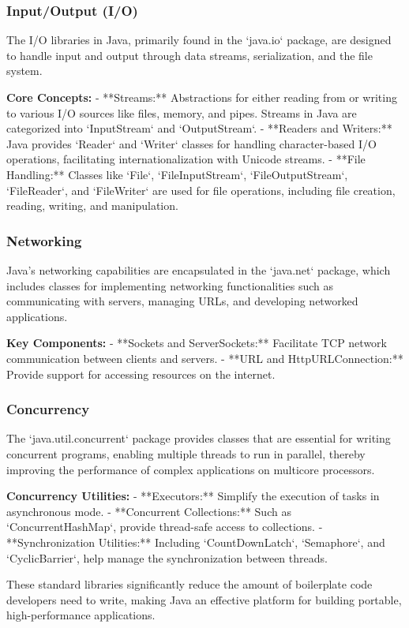 \documentclass{article}
\begin{document}
\subsubsection{Input/Output (I/O)}
The I/O libraries in Java, primarily found in the `java.io` package, are designed to handle input and output through data streams, serialization, and the file system.

\textbf{Core Concepts:}
- **Streams:** Abstractions for either reading from or writing to various I/O sources like files, memory, and pipes. Streams in Java are categorized into `InputStream` and `OutputStream`.
- **Readers and Writers:** Java provides `Reader` and `Writer` classes for handling character-based I/O operations, facilitating internationalization with Unicode streams.
- **File Handling:** Classes like `File`, `FileInputStream`, `FileOutputStream`, `FileReader`, and `FileWriter` are used for file operations, including file creation, reading, writing, and manipulation.

\subsubsection{Networking}
Java's networking capabilities are encapsulated in the `java.net` package, which includes classes for implementing networking functionalities such as communicating with servers, managing URLs, and developing networked applications.

\textbf{Key Components:}
- **Sockets and ServerSockets:** Facilitate TCP network communication between clients and servers.
- **URL and HttpURLConnection:** Provide support for accessing resources on the internet.

\subsubsection{Concurrency}
The `java.util.concurrent` package provides classes that are essential for writing concurrent programs, enabling multiple threads to run in parallel, thereby improving the performance of complex applications on multicore processors.

\textbf{Concurrency Utilities:}
- **Executors:** Simplify the execution of tasks in asynchronous mode.
- **Concurrent Collections:** Such as `ConcurrentHashMap`, provide thread-safe access to collections.
- **Synchronization Utilities:** Including `CountDownLatch`, `Semaphore`, and `CyclicBarrier`, help manage the synchronization between threads.

These standard libraries significantly reduce the amount of boilerplate code developers need to write, making Java an effective platform for building portable, high-performance applications.
\end{document}
